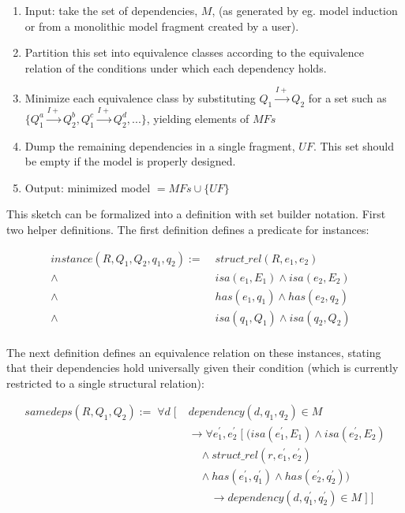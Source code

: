 \documentclass{article}
\begin{document}
\begin{enumerate}

\item Input: take the set of dependencies, $M$, (as generated by eg. model
	induction or from a monolithic model fragment created by a user).  

\item Partition this set into equivalence classes according to the
	equivalence relation of the conditions under which each dependency holds.

\item Minimize each equivalence class by substituting 
	$Q_1 \overset{I+}{\rightarrow} Q_2 $ for a set such as 
	$ \{ Q_1^a \overset{I+}{\rightarrow} Q_2^b, Q_1^c \overset{I+}{\rightarrow} Q_2^d,  . . . \} $, 
	yielding elements of $MFs$

\item Dump the remaining dependencies in a single fragment, $UF$. 
	This set should be empty if the model is properly designed.

\item Output: minimized model $ = MFs \cup \{ UF \} $

\end{enumerate}

This sketch can be formalized into a definition with set builder notation.
First two helper definitions. The first definition defines a predicate for
instances:

\begin{align*}
instance(R, Q_1, Q_2, q_1, q_2) :=
	\; &struct\_rel(R, e_1, e_2) & \\
	\land \; &isa(e_1, E_1) \land isa(e_2, E_2) \\
	\land \; &has(e_1, q_1) \land has(e_2, q_2)  \\
	\land \; &isa(q_1, Q_1) \land isa(q_2, Q_2) \\
\end{align*}

The next definition defines an equivalence relation on these instances, stating that
their dependencies hold universally given their condition (which is currently
restricted to a single structural relation):

\begin{align*}
samedeps(R, Q_1, Q_2) := \; \forall d \; [ \; &dependency(d, q_1, q_2) \in M \\
	& 	\rightarrow \forall e^\prime_1, e^\prime_2 \; [ \; ( isa(e^\prime_1, E_1) \land isa(e^\prime_2, E_2)  \\
	&	\quad 	\land struct\_rel(r, e^\prime_1, e^\prime_2)  \\
	&	\quad 	\land has(e^\prime_1, q^\prime_1) \land has(e^\prime_2, q^\prime_2) ) \\
	& \qquad \rightarrow dependency(d, q^\prime_1, q^\prime_2) \in M \; ] \; ]
\end{align*}
\end{document}

